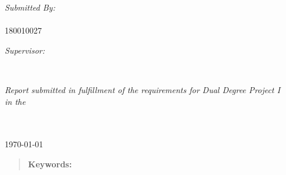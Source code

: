 \documentclass[
11pt, %
oneside, %
english, %
singlespacing, %
liststotoc, %
headsepline, %
]{MastersDoctoralThesis} %
\begin{document}
\begin{titlepage}
\begin{center}
\begin{minipage}[t]{0.4\textwidth}
\begin{flushleft} \large
\emph{Submitted By:}\\
{\authorname \\ 180010027} %
\end{flushleft}
\end{minipage}
\begin{minipage}[t]{0.4\textwidth}
\begin{flushright} \large
\emph{Supervisor:} \\
{\supname} %
\end{flushright}
\end{minipage}\\[1cm]
 
\vfill

\large \textit{Report submitted in fulfillment of the requirements for Dual Degree Project I}\\[0.3cm] %
\textit{in the}\\[0.05cm]
\groupname\\\deptname\\[2cm] %
 
\vfill

{\large \today}\\[2cm] %
 
\vfill
\end{center}
\end{titlepage}




\begin{abstract}
\addchaptertocentry{\abstractname} %

\blindtext

\textbf{Keywords:} \keywordnames



\end{abstract}


\end{document}
